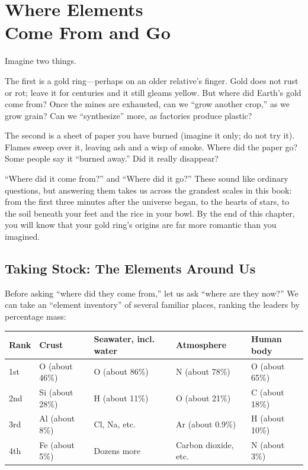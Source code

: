 \chapter[Where Elements Come From and Go]{Where Elements\protect\\ Come From and Go}

\begin{kaichang}
Imagine two things.

The first is a gold ring---perhaps on an older relative's finger. Gold does not rust or rot; leave it for centuries and it still gleams yellow. But where did Earth's gold come from? Once the mines are exhausted, can we ``grow another crop,'' as we grow grain? Can we ``synthesize'' more, as factories produce plastic?

The second is a sheet of paper you have burned (imagine it only; do not try it). Flames sweep over it, leaving ash and a wisp of smoke. Where did the paper go? Some people say it ``burned away.'' Did it really disappear?

``Where did it come from?'' and ``Where did it go?'' These sound like ordinary questions, but answering them takes us across the grandest scales in this book: from the first three minutes after the universe began, to the hearts of stars, to the soil beneath your feet and the rice in your bowl. By the end of this chapter, you will know that your gold ring's origins are far more romantic than you imagined.
\end{kaichang}

\section{Taking Stock: The Elements Around Us}

Before asking ``where did they come from,'' let us ask ``where are they now?'' We can take an ``element inventory'' of several familiar places, ranking the leaders by percentage mass:

\begin{table}[htbp]
\centering
\begin{tabular}{lllll}
\toprule
Rank & Crust & Seawater, incl. water & Atmosphere & Human body \\
\midrule
1st & O (about 46\%) & O (about 86\%) & N (about 78\%) & O (about 65\%) \\
2nd & Si (about 28\%) & H (about 11\%) & O (about 21\%) & C (about 18\%) \\
3rd & Al (about 8\%) & Cl, Na, etc. & Ar (about 0.9\%) & H (about 10\%) \\
4th & Fe (about 5\%) & Dozens more & Carbon dioxide, etc. & N (about 3\%) \\
\bottomrule
\end{tabular}
\end{table}

